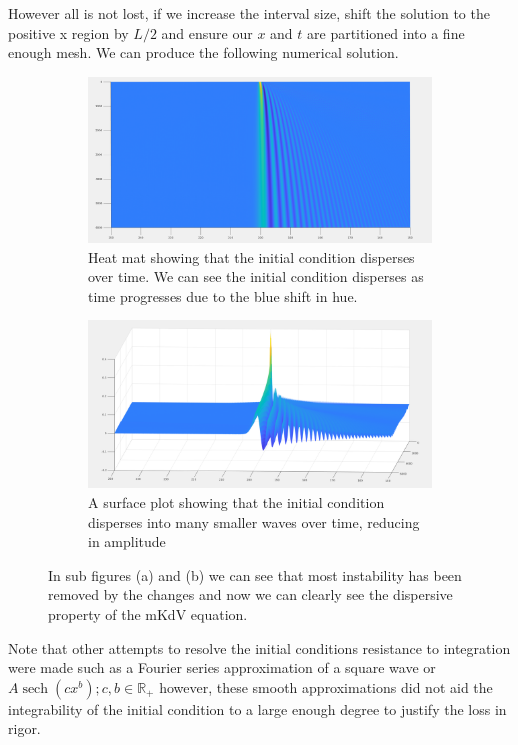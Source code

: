 \documentclass{article}
\DeclareMathOperator{\sech}{sech}
\begin{document}
However all is not lost, if we increase the interval size, shift the solution to the positive x region by $L/2$ and ensure our $x$ and $t$ are partitioned into a fine enough mesh. We can produce the following numerical solution.
\begin{figure}[H]
\centering
\begin{subfigure}[b]{80mm}
\includegraphics[scale=0.13]{figures/simL400.png}
\caption{Heat mat showing that the initial condition disperses over time. We can see the initial condition disperses as time progresses due to the blue shift in hue.}
\label{fig:}
\end{subfigure}
\begin{subfigure}[b]{80mm}
\includegraphics[scale=0.12]{figures/3DsimL400.png}
\caption{A surface plot showing that the initial condition disperses into many smaller waves over time, reducing in amplitude}
\label{fig:}
\end{subfigure}

\caption{In sub figures (a) and (b) we can see that most instability has been removed by the changes and now we can clearly see the dispersive property of the mKdV equation. }
\label{fig:}
\end{figure} 

Note that other attempts to resolve the initial conditions resistance to integration were made such as a Fourier series approximation of a square wave or $A\sech(cx^b); c,b\in \mathbb{R}_+$ however, these smooth approximations did not aid the integrability of the initial condition to a large enough degree to justify the loss in rigor.  
\end{document}
